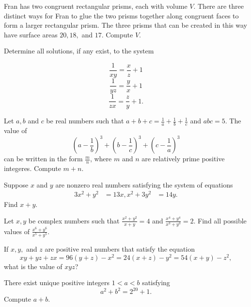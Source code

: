 \documentclass[mast]{lucky}
\begin{document}
\begin{prob}{5}
Fran has two congruent rectangular prisms, each with volume $V$. There are three distinct ways for Fran to glue the two prisms together along congruent faces to form a larger rectangular prism. The three prisms that can be created in this way have surface areas $20,18,$ and $17$. Compute $V$.
\end{prob}


\begin{prob}[vvluo]{6}
Determine all solutions, if any exist, to the system


\[\frac{1}{xy}=\frac{x}{z}+1\]
\[\frac{1}{yz}=\frac{y}{x}+1 \]
\[\frac{1}{zx}=\frac{z}{y}+1.\]
\end{prob}


\begin{prob}[BMT 2020]{6}
Let $a,b$ and $c$ be real numbers such that $a+b+c=\frac{1}{a}+\frac{1}{b}+\frac{1}{c}$ and $abc=5$. The value of
\[(a-\frac{1}{b})^3+(b-\frac{1}{c})^3+(c-\frac{1}{a})^3\]
can be written in the form $\frac{m}{n}$, where $m$ and $n$ are relatively prime positive integeres. Compute $m+n$.
\end{prob}

\begin{prob}{6}
Suppose $x$ and $y$ are nonzero real numbers satisfying the system of equations
\begin{align*}
    3x^2 + y^2 &= 13x,
    x^2 + 3y^2 &= 14y.
\end{align*}
Find $x+y$.
\end{prob}


\begin{prob}{9}
Let $x,y$ be complex numbers such that $\frac{x^2+y^2}{x+y} = 4$ and $\frac{x^4+y^4}{x^3+y^3} = 2$. Find all possible values of 
$\frac{x^6+y^6}{x^5+y^5}$.
\end{prob}

\begin{req}[JMC 10 2021/18]{9}
If $x,y,$ and $z$ are positive real numbers that satisfy the equation
\[xy+yz+zx=96(y+z)-x^2 = 24(x+z) -y^2 = 54(x+y) -z^2,\]
what is the value of $xyz$?
\end{req}

\begin{prob}[CARML 2019/8]{13}
There exist unique positive integers $1<a<b$ satisfying
\[a^2+b^2=2^{20}+1.\]
Compute $a+b$.
\end{prob}
\end{document}
